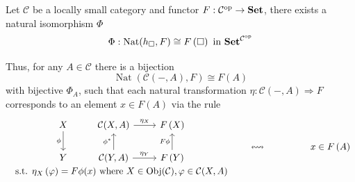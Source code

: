 \documentclass[12pt, oneside]{book}
\begin{document}
\begin{theorem}
    Let $\mathcal{C}$ be a locally small category and functor $F: \mathcal{C}^{\mathrm{op}} \rightarrow \mathbf{Set}$, there exists a natural isomorphism $\Phi$
    \begin{equation*}
        \Phi:\operatorname{Nat}(h_{\square}, F)\cong F\left(\square\right) \text{ in } \mathbf{Set}^{\mathcal{C}^{\mathrm{op}}}
    \end{equation*}
    \begin{remark}
        Thus, for any $A\in \mathcal{C}$ there is a bijection
        \begin{equation*}
            \operatorname{Nat}(\mathcal{C}(-,A), F) \cong F \left(A\right)
        \end{equation*}
        with bijective $\Phi_A$, such that each natural transformation $\eta: \mathcal{C}(-,A) \Rightarrow F$ corresponds to an element $x \in F \left(A\right)$ via the rule
        \begin{equation*}
            \begin{array}{ccccc}
                \begin{array}{cc}
                    \begin{tikzcd}
                        X \arrow[d,"\phi"']&\mathcal{C}(X,A) \arrow[r, "\eta_X"]& F \left(X\right)  \\
                        Y&\mathcal{C}(Y,A) \arrow[u,"\phi^*"] \arrow[r, "\eta_Y"] & F \left(Y\right)\arrow[u,"F\phi"]
                    \end{tikzcd}
                    \\
                    \text{s.t. } \eta_X\left(\varphi\right) = F\phi(x) \text{ where } X \in \Obj(\mathcal{C}), \varphi \in \mathcal{C}(X,A)
                \end{array}
                \quad & \leftrightsquigarrow & \quad & \quad & x\in F \left(A\right)
            \end{array}
        \end{equation*}
    \end{remark}
\end{theorem}
\end{document}
